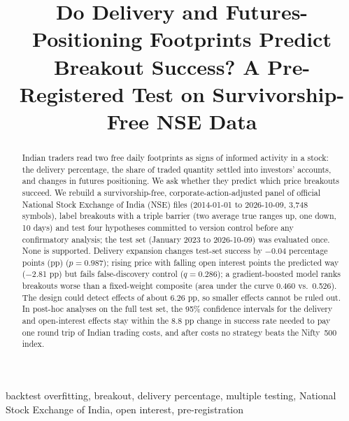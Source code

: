 \documentclass[conference]{IEEEtran}
\newcommand{\DataStart}{2014-01-01}
\newcommand{\DataEnd}{2026-10-09}
\newcommand{\NSymbols}{3,748}
\newcommand{\HOneDiff}{\ensuremath{-}0.04}
\newcommand{\HOneP}{0.987}
\newcommand{\HTwoDiff}{\ensuremath{-}2.81}
\newcommand{\HTwoQ}{0.286}
\newcommand{\AUCxgb}{0.460}
\newcommand{\AUCcomp}{0.526}
\newcommand{\MDEHOne}{6.26}
\newcommand{\BreakEven}{8.8}
\begin{document}
\title{Do Delivery and Futures-Positioning Footprints Predict Breakout Success? A Pre-Registered Test on Survivorship-Free NSE Data}

\author{
}

\maketitle

\begin{abstract}
Indian traders read two free daily footprints as signs of informed activity in a stock: the delivery
percentage, the share of traded quantity settled into investors' accounts, and changes in futures positioning.
We ask whether they predict which price breakouts succeed. We rebuild a survivorship-free,
corporate-action-adjusted panel of official National Stock Exchange of India (NSE) files (\DataStart{} to
\DataEnd, \NSymbols{} symbols), label breakouts with a triple barrier (two average true ranges up, one down,
10 days) and test four hypotheses committed to version control before any confirmatory analysis; the test set
(January 2023 to \DataEnd) was evaluated once. None is supported. Delivery expansion changes test-set success
by \HOneDiff{} percentage points (pp) ($p=\HOneP$); rising price with falling open interest points the
predicted way (\HTwoDiff{} pp) but fails false-discovery control ($q=\HTwoQ$); a gradient-boosted model
ranks breakouts worse than a fixed-weight composite (area under the curve \AUCxgb{} vs.\ \AUCcomp). The
design could detect effects of about \MDEHOne{} pp, so smaller effects cannot be ruled out. In post-hoc
analyses on the full test set, the 95\% confidence intervals for the delivery and open-interest effects stay
within the \BreakEven{} pp change in success rate needed to pay one round trip of Indian trading costs, and
after costs no strategy beats the Nifty~500 index.
\end{abstract}

\begin{IEEEkeywords}
backtest overfitting, breakout, delivery percentage, multiple testing, National Stock Exchange of India, open
interest, pre-registration
\end{IEEEkeywords}
\end{document}
